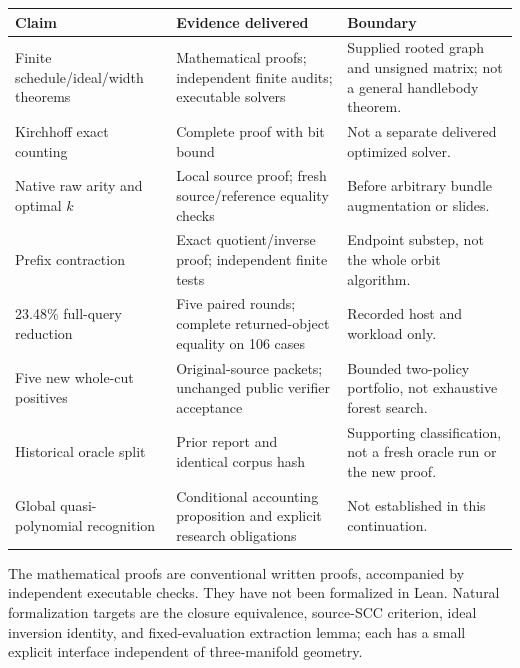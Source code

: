 \begin{longtable}{P{0.29\textwidth}P{0.28\textwidth}P{0.31\textwidth}}
\toprule
Claim & Evidence delivered & Boundary\\
\midrule
\endhead
Finite schedule/ideal/width theorems & Mathematical proofs; independent
finite audits; executable solvers & Supplied rooted graph and unsigned
matrix; not a general handlebody theorem.\\
Kirchhoff exact counting & Complete proof with bit bound & Not a separate
delivered optimized solver.\\
Native raw arity and optimal $k$ & Local source proof; fresh source/reference
equality checks & Before arbitrary bundle augmentation or slides.\\
Prefix contraction & Exact quotient/inverse proof; independent finite tests
& Endpoint substep, not the whole orbit algorithm.\\
23.48\% full-query reduction & Five paired rounds; complete returned-object
equality on 106 cases & Recorded host and workload only.\\
Five new whole-cut positives & Original-source packets; unchanged public
verifier acceptance & Bounded two-policy portfolio, not exhaustive forest
search.\\
Historical oracle split & Prior report and identical corpus hash & Supporting
classification, not a fresh oracle run or the new proof.\\
Global quasi-polynomial recognition & Conditional accounting proposition
and explicit research obligations & Not established in this continuation.\\
\bottomrule
\end{longtable}

The mathematical proofs are conventional written proofs, accompanied by
independent executable checks.  They have not been formalized in Lean.
Natural formalization targets are the closure equivalence, source-SCC
criterion, ideal inversion identity, and fixed-evaluation extraction lemma;
each has a small explicit interface independent of three-manifold geometry.
